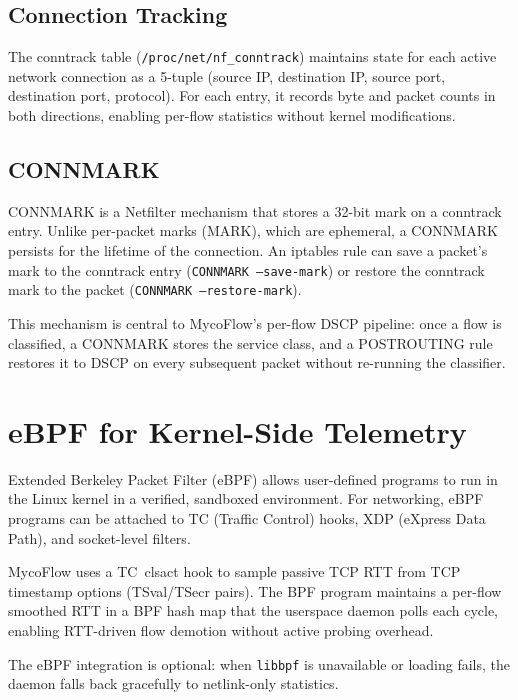 \subsection{Connection Tracking}

The conntrack table (\texttt{/proc/net/nf\_conntrack}) maintains state for each active network connection as a 5-tuple (source IP, destination IP, source port, destination port, protocol). For each entry, it records byte and packet counts in both directions, enabling per-flow statistics without kernel modifications.

\subsection{CONNMARK}

CONNMARK is a Netfilter mechanism that stores a 32-bit mark on a conntrack entry. Unlike per-packet marks (MARK), which are ephemeral, a CONNMARK persists for the lifetime of the connection. An iptables rule can save a packet's mark to the conntrack entry (\texttt{CONNMARK --save-mark}) or restore the conntrack mark to the packet (\texttt{CONNMARK --restore-mark}).

This mechanism is central to MycoFlow's per-flow DSCP pipeline: once a flow is classified, a CONNMARK stores the service class, and a POSTROUTING rule restores it to DSCP on every subsequent packet without re-running the classifier.

\section{eBPF for Kernel-Side Telemetry}

Extended Berkeley Packet Filter (eBPF) allows user-defined programs to run in the Linux kernel in a verified, sandboxed environment. For networking, eBPF programs can be attached to TC (Traffic Control) hooks, XDP (eXpress Data Path), and socket-level filters.

MycoFlow uses a TC~clsact hook to sample passive TCP RTT from TCP timestamp options (TSval/TSecr pairs). The BPF program maintains a per-flow smoothed RTT in a BPF hash map that the userspace daemon polls each cycle, enabling RTT-driven flow demotion without active probing overhead.

The eBPF integration is optional: when \texttt{libbpf} is unavailable or loading fails, the daemon falls back gracefully to netlink-only statistics.
